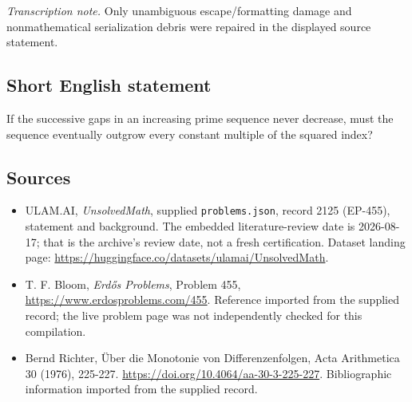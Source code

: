 \documentclass[11pt,a4paper]{article}
\begin{document}
{\small\emph{Transcription note.} Only unambiguous escape/formatting damage and nonmathematical serialization debris were repaired in the displayed source statement.}

\subsection{Short English statement}

If the successive gaps in an increasing prime sequence never decrease, must the sequence eventually outgrow every constant multiple of the squared index?

\subsection{Sources}

{\small

\begin{itemize}

\item[\hypertarget{source:2125:1}{S1}] ULAM.AI, \emph{UnsolvedMath}, supplied \texttt{problems.json}, record 2125 (EP-455), statement and background. The embedded literature-review date is 2026-08-17; that is the archive’s review date, not a fresh certification. Dataset landing page: \url{https://huggingface.co/datasets/ulamai/UnsolvedMath}.

\item[\hypertarget{source:2125:2}{S2}] T. F. Bloom, \emph{Erdős Problems}, Problem 455, \url{https://www.erdosproblems.com/455}. Reference imported from the supplied record; the live problem page was not independently checked for this compilation.

\item[\hypertarget{source:2125:3}{S3}] Bernd Richter, Über die Monotonie von Differenzenfolgen, Acta Arithmetica 30 (1976), 225-227. \url{https://doi.org/10.4064/aa-30-3-225-227}. Bibliographic information imported from the supplied record.

\end{itemize}

}

\label{end:2125}
\end{document}
